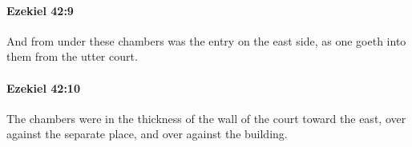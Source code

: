 		\paragraph{Ezekiel 42:9} %
			\label{EZEKIEL-42-9}

			And from under these chambers was the entry on the east side, as one goeth into them from the utter court.


		\paragraph{Ezekiel 42:10} %
			\label{EZEKIEL-42-10}

			The chambers were in the thickness of the wall of the court toward the east, over against the separate place, and over against the building.


